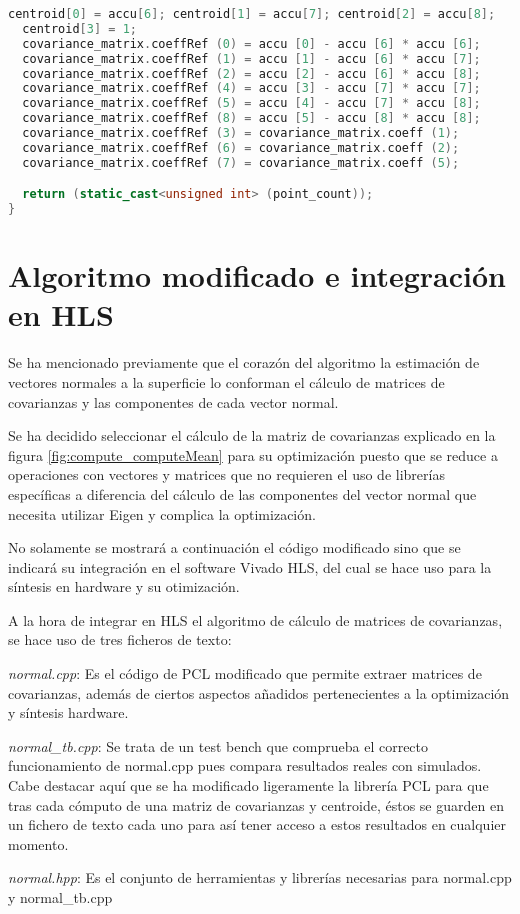  \begin{lstlisting}[language=C++,breaklines]
  centroid[0] = accu[6]; centroid[1] = accu[7]; centroid[2] = accu[8];
  centroid[3] = 1;
  covariance_matrix.coeffRef (0) = accu [0] - accu [6] * accu [6];
  covariance_matrix.coeffRef (1) = accu [1] - accu [6] * accu [7];
  covariance_matrix.coeffRef (2) = accu [2] - accu [6] * accu [8];
  covariance_matrix.coeffRef (4) = accu [3] - accu [7] * accu [7];
  covariance_matrix.coeffRef (5) = accu [4] - accu [7] * accu [8];
  covariance_matrix.coeffRef (8) = accu [5] - accu [8] * accu [8];
  covariance_matrix.coeffRef (3) = covariance_matrix.coeff (1);
  covariance_matrix.coeffRef (6) = covariance_matrix.coeff (2);
  covariance_matrix.coeffRef (7) = covariance_matrix.coeff (5);

  return (static_cast<unsigned int> (point_count));
}
\end{lstlisting}



\section{Algoritmo modificado e integración en HLS}
Se ha mencionado previamente que el corazón del algoritmo la estimación de vectores normales a la superficie lo conforman el cálculo de matrices de covarianzas y las componentes de cada vector normal.

Se ha decidido seleccionar el cálculo de la matriz de covarianzas explicado en la figura \ref{fig:compute_computeMean} para su optimización puesto que se reduce a operaciones con vectores y matrices que no requieren el uso de librerías específicas a diferencia del cálculo de las componentes del vector normal que necesita utilizar Eigen y complica la optimización.

No solamente se mostrará a continuación el código modificado sino que se indicará su integración en el software Vivado HLS, del cual se hace uso para la síntesis en hardware y su otimización.

A la hora de integrar en HLS el algoritmo de cálculo de matrices de covarianzas, se hace uso de tres ficheros de texto:

\begin{list}{•}
\item \textit{normal.cpp}: Es el código de PCL modificado que permite extraer matrices de covarianzas, además de ciertos aspectos añadidos pertenecientes a la optimización y síntesis hardware.
\item \textit{normal\_tb.cpp}: Se trata de un test bench que comprueba el correcto funcionamiento de normal.cpp pues compara resultados reales con simulados. Cabe destacar aquí que se ha modificado ligeramente la librería PCL para que tras cada cómputo de una matriz de covarianzas y centroide, éstos se guarden en un fichero de texto cada uno para así tener acceso a estos resultados en cualquier momento.
\item \textit{normal.hpp}: Es el conjunto de herramientas y librerías necesarias para normal.cpp y normal\_tb.cpp
\end{list}

